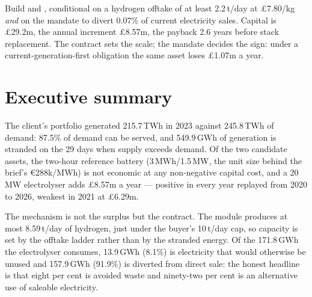 \documentclass[11pt,a4paper]{article}
\begin{document}
\thispagestyle{firststyle}


\begin{reportmeta}
\end{reportmeta}

\begin{keyfigures}
\end{keyfigures}

\begin{decisionbox}[Decision]
Build  and , conditional on a hydrogen
offtake of at least 2.2\,t/day at £7.80/kg \emph{and} on the mandate to divert
0.07\% of current electricity sales. Capital is £29.2m, the annual increment £8.57m, the
payback 2.6 years before stack replacement. The contract sets the scale; the mandate decides
the sign: under a current-generation-first obligation the same asset loses £1.07m a year.
\end{decisionbox}

\section{Executive summary}

The client's portfolio generated 215.7\,TWh in 2023 against 245.8\,TWh of demand: 87.5\% of
demand can be served, and 549.9\,GWh of generation is stranded on the 29 days when supply
exceeds demand. Of the two candidate assets, the two-hour reference battery (3\,MWh/1.5\,MW, the
unit size behind the brief's €288k/MWh) is not
economic at any non-negative capital cost, and a 20\,MW electrolyser adds £8.57m a year ---
positive in every year replayed from 2020 to 2026, weakest in 2021 at £6.29m.

The mechanism is not the surplus but the contract. The module produces at most 8.59\,t/day
of hydrogen, just under the buyer's 10\,t/day cap, so capacity is set by the offtake ladder
rather than by the stranded energy. Of the 171.8\,GWh the electrolyser consumes, 13.9\,GWh
(8.1\%) is electricity that would otherwise be unused and 157.9\,GWh (91.9\%) is diverted
from direct sale: the honest headline is that eight per cent is avoided waste and ninety-two
per cent is an alternative use of saleable electricity.
\end{document}
